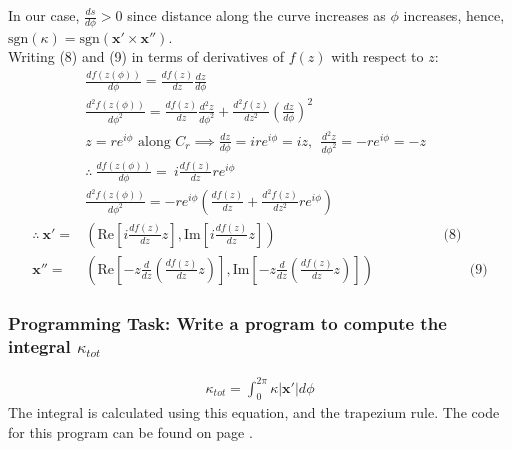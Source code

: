 \documentclass[12pt, a4paper]{article}
\begin{document}
In our case, $\frac{ds}{d\phi} > 0$ since distance along the curve increases as $\phi$ increases, hence,
$\text{sgn}(\kappa) = \text{sgn}\left(\bm{x'}\times\bm{x''}\right)$.
\\

Writing (8) and (9) in terms of derivatives of $f(z)$ with respect to $z$:
\begin{align}
	& \frac{df(z(\phi))}{d\phi} = \frac{df(z)}{dz}\frac{dz}{d\phi} \nonumber\\
	& \frac{d^{2}f(z(\phi))}{d\phi^{2}} = \frac{df(z)}{dz} \frac{d^{2}z}{d\phi^{2}} + \frac{d^{2}f(z)}{dz^{2}} \left(\frac{dz}{d\phi}\right)^{2} \nonumber\\
	& z = re^{i\phi} \text{ along } C_{r} \implies \frac{dz}{d\phi} = ire^{i\phi} = iz, ~~ \frac{d^{2}z}{d\phi^{2}} = -re^{i\phi} = -z \nonumber\\
	& \therefore ~ \frac{df(z(\phi))}{d\phi} = ~ i\frac{df(z)}{dz}re^{i\phi} \nonumber\\
	& \frac{d^{2}f(z(\phi))}{d\phi^{2}} = -re^{i\phi}\left(\frac{df(z)}{dz} + \frac{d^{2}f(z)}{dz^{2}}re^{i\phi}\right) \nonumber\\
	\therefore ~ \bm{x'} = & \left(\text{Re}\left[i\frac{df(z)}{dz}z\right], \text{Im}\left[i\frac{df(z)}{dz}z\right] \right) ~~~~~~~~~~~~~~~~~~~~~~~~~~~~~~~~~~~~~~~~~~~~~~~~~~~~~~ \text{(8)} \nonumber\\
	\bm{x''} = & \left(\text{Re}\left[-z\frac{d}{dz}\left(\frac{df(z)}{dz}z\right) \right], \text{Im}\left[-z\frac{d}{dz}\left(\frac{df(z)}{dz}z\right) \right] \right) ~~~~~~~~~~~~~~~~~~~~~~~~~~~~~~~ \text{(9)} \nonumber
\end{align}

\subsubsection*{Programming Task: Write a program to compute the integral $\kappa_{tot}$}

\begin{align}
	\kappa_{tot} = \int_{0}^{2\pi} \kappa |\bm{x'}| d\phi \nonumber
\end{align}
The integral is calculated using this equation, and the trapezium rule. The code for this program can be found on page \pageref{programmingtask2}.
\end{document}
